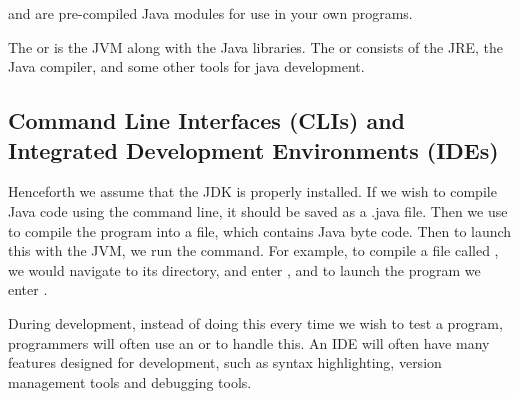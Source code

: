 \documentclass[11pt]{report}
\begin{document}
\begin{figure}[H]
\begin{subfigure}[t]{.5\textwidth}
{
        }
    \end{subfigure}
\end{figure}

\begin{defi}
     and  are pre-compiled Java modules for use in your own programs.
\end{defi}
The  or  is the JVM along with the Java libraries. The  or  consists of the JRE, the Java compiler, and some other tools for java development.

\subsection{Command Line Interfaces (CLIs) and Integrated Development Environments (IDEs)}
Henceforth we assume that the JDK is properly installed. If we wish to compile Java code using the command line, it should be saved as a .java file. Then we use  to compile the program into a  file, which contains Java byte code. Then to launch this with the JVM, we run the  command. For example, to compile a file called , we would navigate to its directory, and enter , and to launch the program we enter . 

\par During development, instead of doing this every time we wish to test a program, programmers will often use an  or  to handle this. An IDE will often have many features designed for development, such as syntax highlighting, version management tools and debugging tools.
\end{document}
